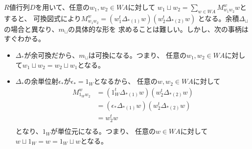 		$R$値行列$D$を用いて、任意の$w_1,w_2\in WA$に対して
		$w_1\sqcup w_2=\sum_{w\in WA}M_{w_1w_2}^ww$とすると、
		可換図式により$M_{w_1w_2}^w=(w_1^t\Delta_{*(1)}w)(w_2^t\Delta_{*(2)}w)$
		となる。余積$\Delta_\sqcup$の場合と異なり、$m_\sqcup$の具体的な形を
		求めることは難しい。しかし、次の事柄はすぐわかる。
		\begin{itemize}\setlength{\itemsep}{-1mm} %
			\item $\Delta_*$が余可換だから、$m_\sqcup$は可換になる。つまり、
			任意の$w_1,w_2\in WA$に対して$w_1\sqcup w_2=w_2\sqcup w_1$となる。
			\item $\Delta_*$の余単位射$\epsilon_*$が$\epsilon_*=1_W$となるから、
			任意の$w,w_2\in WA$に対して
			\begin{equation*}\begin{split} %
				M_{1_Ww_2}^w &= (1_W^t\Delta_{*(1)}w)(w_2^t\Delta_{*(2)}w) \\
				&= (\epsilon_*\Delta_{*(1)}w)(w_2^t\Delta_{*(2)}w) \\
				&= w_2^t w \\
			\end{split}\end{equation*} %
			となり、$1_W$が単位元になる。つまり、
			任意の$w\in WA$に対して$w\sqcup 1_W=w=1_W\sqcup w$となる。
		\end{itemize} %

